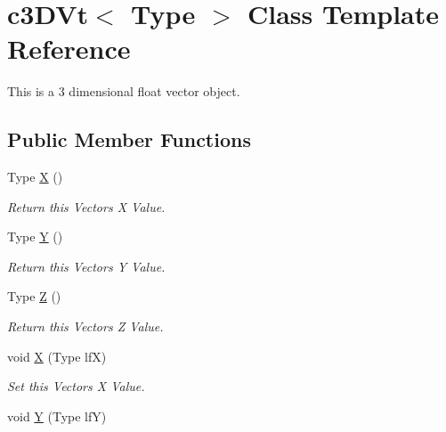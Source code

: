 \hypertarget{classc3_d_vt}{
\section{c3DVt$<$ Type $>$ Class Template Reference}
\label{classc3_d_vt}
}


This is a 3 dimensional float vector object.  


\subsection*{Public Member Functions}
\begin{DoxyCompactItemize}
\item 
\hypertarget{classc3_d_vt_a8012283d4d8838142c92df89278b60fb}{
Type \hyperlink{classc3_d_vt_a8012283d4d8838142c92df89278b60fb}{X} ()}
\label{classc3_d_vt_a8012283d4d8838142c92df89278b60fb}

\begin{DoxyCompactList}\small\item\em Return this Vectors X Value. \end{DoxyCompactList}\item 
\hypertarget{classc3_d_vt_a3ad320ce27b3a103fa4bbb0add36289d}{
Type \hyperlink{classc3_d_vt_a3ad320ce27b3a103fa4bbb0add36289d}{Y} ()}
\label{classc3_d_vt_a3ad320ce27b3a103fa4bbb0add36289d}

\begin{DoxyCompactList}\small\item\em Return this Vectors Y Value. \end{DoxyCompactList}\item 
\hypertarget{classc3_d_vt_aa82e777d5727e9fa51ad03e5c390c6b1}{
Type \hyperlink{classc3_d_vt_aa82e777d5727e9fa51ad03e5c390c6b1}{Z} ()}
\label{classc3_d_vt_aa82e777d5727e9fa51ad03e5c390c6b1}

\begin{DoxyCompactList}\small\item\em Return this Vectors Z Value. \end{DoxyCompactList}\item 
\hypertarget{classc3_d_vt_a0c7606153494a600d48ef7c75df2fecc}{
void \hyperlink{classc3_d_vt_a0c7606153494a600d48ef7c75df2fecc}{X} (Type lfX)}
\label{classc3_d_vt_a0c7606153494a600d48ef7c75df2fecc}

\begin{DoxyCompactList}\small\item\em Set this Vectors X Value. \end{DoxyCompactList}\item 
\hypertarget{classc3_d_vt_a8b516ee26ae56aed04a71abc4c3240fe}{
void \hyperlink{classc3_d_vt_a8b516ee26ae56aed04a71abc4c3240fe}{Y} (Type lfY)}
\label{classc3_d_vt_a8b516ee26ae56aed04a71abc4c3240fe}


\end{DoxyCompactItemize}
